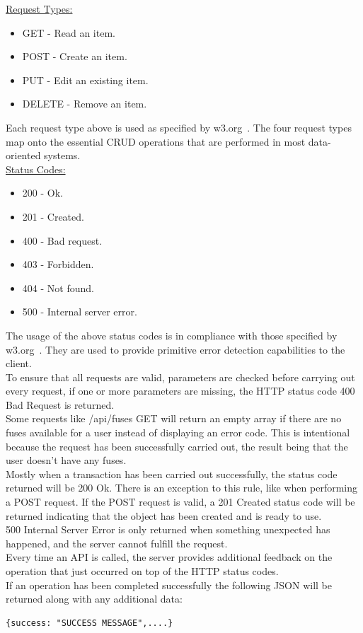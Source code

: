 \documentclass[draft,preprint,12pt,3p]{elsarticle}
\begin{document}
\underline{Request Types:}
\begin{itemize}
\item GET - Read an item.
\item POST - Create an item.
\item PUT - Edit an existing item.
\item DELETE - Remove an item.
\end{itemize}

Each request type above is used as specified by w3.org~\cite{w3}. The four request types map onto the essential CRUD operations that are performed in most data-oriented systems.\\

\underline{Status Codes:}
\begin{itemize}
\item 200 - Ok.
\item 201 - Created.
\item 400 - Bad request.
\item 403 - Forbidden.
\item 404 - Not found.
\item 500 - Internal server error.
\end{itemize}

The usage of the above status codes is in compliance with those specified by w3.org~\cite{w3}. They are used to provide primitive error detection capabilities to the client.\\
To ensure that all requests are valid, parameters are checked before carrying out every request, if one or more parameters are missing, the HTTP status code 400 Bad Request is returned.\\
Some requests like /api/fuses GET will return an empty array if there are no fuses available for a user instead of displaying an error code. This is intentional because the request has been successfully carried out, the result being that the user doesn't have any fuses.\\
Mostly when a transaction has been carried out successfully, the status code returned will be 200 Ok. There is an exception to this rule, like when performing a POST request. If the POST request is valid, a 201 Created status code will be returned indicating that the object has been created and is ready to use.\\
500 Internal Server Error is only returned when something unexpected has happened, and the server cannot fulfill the request.\\
Every time an API is called, the server provides additional feedback on the operation that just occurred on top of the HTTP status codes.\\
If an operation has been completed successfully the following JSON will be returned along with any additional data:\\[5pt]
\begin{verbatim}
{success: "SUCCESS MESSAGE",....}
\end{verbatim}
\end{document}
